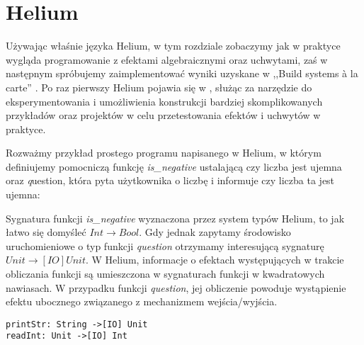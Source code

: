 \section{Helium}



Używając właśnie języka Helium, w tym rozdziale zobaczymy jak w praktyce wygląda programowanie z efektami algebraicznymi oraz uchwytami, zaś w następnym spróbujemy zaimplementować wyniki uzyskane w ,,Build systems {\`a} la carte'' \cite{mokhov2018build, mokhov2020build}. Po raz pierwszy Helium pojawia się w \cite{biernacki2019abstracting}, służąc za narzędzie do eksperymentowania i umożliwienia konstrukcji bardziej skomplikowanych przykładów oraz projektów w celu przetestowania efektów i uchwytów w praktyce.

Rozważmy przykład prostego programu napisanego w Helium, w którym definiujemy pomocniczą funkcję \textit{is\_negative} ustalającą czy liczba jest ujemna oraz {\textit question}, która pyta użytkownika o liczbę i informuje czy liczba ta jest ujemna:



Sygnatura funkcji \textit{is\_negative} wyznaczona przez system typów Helium, to jak łatwo się domyśleć \(\mathit{Int \rightarrow Bool}\). Gdy jednak zapytamy środowisko uruchomieniowe o typ funkcji \textit{question} otrzymamy interesującą sygnaturę \(\mathit{Unit \rightarrow[IO] Unit}\). W Helium, informacje o efektach występujących w trakcie obliczania funkcji są umieszczona w sygnaturach funkcji w kwadratowych nawiasach. W przypadku funkcji \textit{question}, jej obliczenie powoduje wystąpienie efektu ubocznego związanego z mechanizmem wejścia/wyjścia. 

\lstset{style=helium}
\begin{lstlisting}
printStr: String ->[IO] Unit
readInt: Unit ->[IO] Int
\end{lstlisting}

